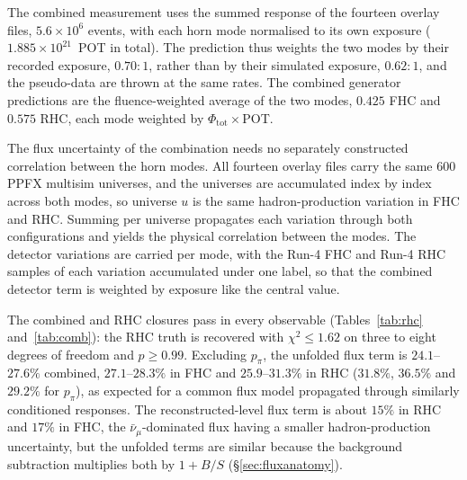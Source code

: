 \documentclass[11pt,a4paper]{article}
\begin{document}
The combined measurement uses the summed response of the fourteen overlay files,
$5.6\times10^{6}$ events, with each horn mode normalised to its own exposure
($1.885\times10^{21}$~POT in total). The prediction thus weights the two modes by their recorded
exposure, $0.70{:}1$, rather than by their simulated exposure, $0.62{:}1$, and the pseudo-data are
thrown at the same rates. The combined generator predictions are the fluence-weighted average of the
two modes, $0.425$ FHC and $0.575$ RHC, each mode weighted by $\Phi_\mathrm{tot}\times$POT.

The flux uncertainty of the combination needs no separately constructed correlation between the
horn modes. All fourteen overlay files carry the same $600$ PPFX multisim universes, and the
universes are accumulated index by index across both modes, so universe $u$ is the same
hadron-production variation in FHC and RHC. Summing per universe propagates each variation through
both configurations and yields the physical correlation between the modes. The detector variations
are carried per mode, with the Run-4 FHC and Run-4 RHC samples of each variation accumulated under
one label, so that the combined detector term is weighted by exposure like the central value.

The combined and RHC closures pass in every observable (Tables~\ref{tab:rhc} and~\ref{tab:comb}):
the RHC truth is recovered with $\chi^2\le1.62$ on three to eight degrees of freedom and $p\ge0.99$.
Excluding $p_\pi$, the unfolded flux term is $24.1$--$27.6\%$ combined, $27.1$--$28.3\%$ in FHC and
$25.9$--$31.3\%$ in RHC ($31.8\%$, $36.5\%$ and $29.2\%$ for $p_\pi$), as expected for a common flux
model propagated through similarly conditioned responses. The
reconstructed-level flux term is about $15\%$ in RHC and $17\%$ in FHC, the $\bar\nu_\mu$-dominated
flux having a smaller hadron-production uncertainty, but the unfolded terms are similar because the
background subtraction multiplies both by $1+B/S$ (\S\ref{sec:fluxanatomy}).
\end{document}

